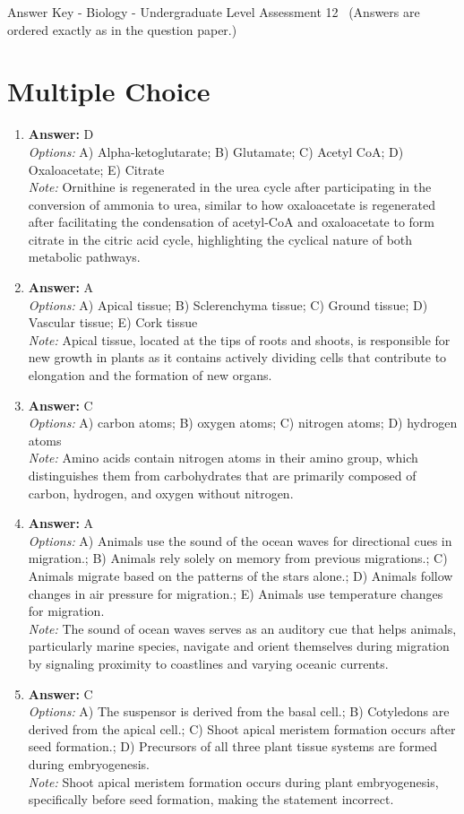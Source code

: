 \documentclass[12pt]{article}
\begin{document}
\begin{center}
Answer Key - Biology - Undergraduate Level Assessment 12 \
\small (Answers are ordered exactly as in the question paper.)
\end{center}

\section*{Multiple Choice}
\begin{enumerate}[label=\arabic*.]
\item \textbf{Answer:} D
\\ \textit{Options:} A) Alpha-ketoglutarate; B) Glutamate; C) Acetyl CoA; D) Oxaloacetate; E) Citrate
\\ \textit{Note:} Ornithine is regenerated in the urea cycle after participating in the conversion of ammonia to urea, similar to how oxaloacetate is regenerated after facilitating the condensation of acetyl-CoA and oxaloacetate to form citrate in the citric acid cycle, highlighting the cyclical nature of both metabolic pathways.
\item \textbf{Answer:} A
\\ \textit{Options:} A) Apical tissue; B) Sclerenchyma tissue; C) Ground tissue; D) Vascular tissue; E) Cork tissue
\\ \textit{Note:} Apical tissue, located at the tips of roots and shoots, is responsible for new growth in plants as it contains actively dividing cells that contribute to elongation and the formation of new organs.
\item \textbf{Answer:} C
\\ \textit{Options:} A) carbon atoms; B) oxygen atoms; C) nitrogen atoms; D) hydrogen atoms
\\ \textit{Note:} Amino acids contain nitrogen atoms in their amino group, which distinguishes them from carbohydrates that are primarily composed of carbon, hydrogen, and oxygen without nitrogen.
\item \textbf{Answer:} A
\\ \textit{Options:} A) Animals use the sound of the ocean waves for directional cues in migration.; B) Animals rely solely on memory from previous migrations.; C) Animals migrate based on the patterns of the stars alone.; D) Animals follow changes in air pressure for migration.; E) Animals use temperature changes for migration.
\\ \textit{Note:} The sound of ocean waves serves as an auditory cue that helps animals, particularly marine species, navigate and orient themselves during migration by signaling proximity to coastlines and varying oceanic currents.
\item \textbf{Answer:} C
\\ \textit{Options:} A) The suspensor is derived from the basal cell.; B) Cotyledons are derived from the apical cell.; C) Shoot apical meristem formation occurs after seed formation.; D) Precursors of all three plant tissue systems are formed during embryogenesis.
\\ \textit{Note:} Shoot apical meristem formation occurs during plant embryogenesis, specifically before seed formation, making the statement incorrect.
\end{enumerate}
\end{document}
